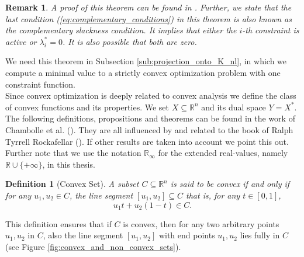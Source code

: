 \documentclass[abstracton]{scrreprt}
\newtheorem{definition}[theorem]{Definition}
\newtheorem{remark}[theorem]{Remark}
\begin{document}
        \begin{remark} %
            A proof of this theorem can be found in \cite{Nocedal-Wright}. Further, we state that the last condition (\ref{eq:complementary_conditions}) in this theorem is also known as the complementary slackness condition. It implies that either the $i$-th constraint is active or $\lambda_{i}^{\ast} = 0$. It is also possible that both are zero.
        \end{remark}
        We need this theorem in Subsection \ref{sub:projection_onto_K_nl}, in which we compute a minimal value to a strictly convex optimization problem with one constraint function.\\
        Since convex optimization is deeply related to convex analysis we define the class of convex functions and its properties. We set $X \subseteq \mathbb{R}^{n}$ and its dual space $Y = X^{\ast}$. The following definitions, propositions and theorems can be found in the work of Chambolle et al. (\cite{Chambolle-et-al-10}). They are all influenced by and related to the book of Ralph Tyrrell Rockafellar (\cite{Rockafellar}). If other results are taken into account we point this out. Further note that we use the notation $\mathbb{R}_{\infty}$ for the extended real-values, namely $\mathbb{R} \cup \{ +\infty \}$, in this thesis.
        \begin{definition}[Convex Set] %
        \label{def:convex_set}
            A subset $C \subseteq \mathbb{R}^{n}$ is said to be convex if and only if for any $u_{1}, u_{2} \in C$, the line segment $[u_{1}, u_{2}] \subseteq C$ that is, for any $t \in [0, 1]$,
                $$
                    u_{1}t + u_{2}(1 - t) \in C.
                $$
        \end{definition}
        This definition ensures that if $C$ is convex, then for any two arbitrary points $u_{1}, u_{2}$ in $C$, also the line segment $[u_{1}, u_{2}]$ with end points $u_{1}, u_{2}$ lies fully in $C$ (see Figure \ref{fig:convex_and_non_convex_sets}).
\end{document}
